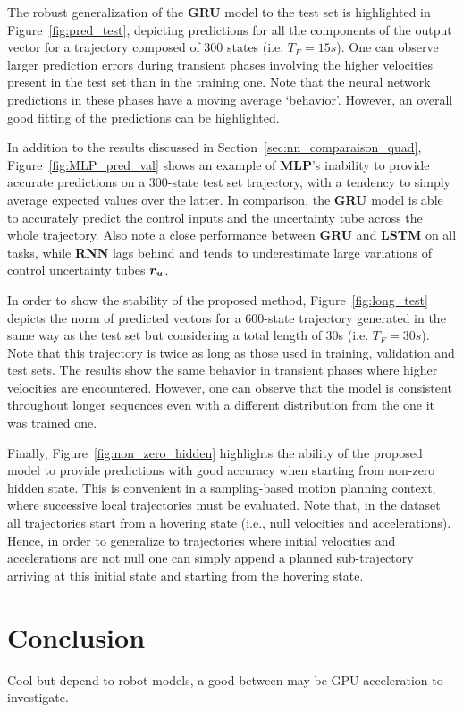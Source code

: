The robust generalization of the \textbf{GRU} model to the test set is highlighted in Figure~\ref{fig:pred_test}, depicting predictions for all the components of the output vector for a trajectory composed of 300 states (i.e. $T_F=15s$).
One can observe larger prediction errors during transient phases involving the higher velocities present in the test set than in the training one.
Note that the neural network predictions in these phases have a moving average `behavior'. 
However, an overall good fitting of the predictions can be highlighted.

In addition to the results discussed in Section~\ref{sec:nn_comparaison_quad}, Figure~\ref{fig:MLP_pred_val} shows an example of \textbf{MLP}'s inability to provide accurate predictions on a 300-state test set trajectory, with a tendency to simply average expected values over the latter.
In comparison, the \textbf{GRU} model is able to accurately predict the control inputs and the uncertainty tube across the whole trajectory. 
Also note a close performance between \textbf{GRU} and \textbf{LSTM} on all tasks, while \textbf{RNN} lags behind and tends to underestimate large variations of control uncertainty tubes $\boldsymbol{r_u}$.

In order to show the stability of the proposed method, Figure~\ref{fig:long_test} depicts the norm of predicted vectors for a 600-state trajectory generated in the same way as the test set but considering a total length of 30s (i.e. $T_F=30s$).
Note that this trajectory is twice as long as those used in training, validation and test sets.
The results show the same behavior in transient phases where higher velocities are encountered.
However, one can observe that the model is consistent throughout longer sequences even with a different distribution from the one it was trained one. 

Finally, Figure~\ref{fig:non_zero_hidden} highlights the ability of the proposed model to provide predictions with good accuracy when starting from non-zero hidden state. 
This is convenient in a sampling-based motion planning context, where successive local trajectories must be evaluated.
Note that, in the dataset all trajectories start from a hovering state (i.e., null velocities and accelerations). 
Hence, in order to generalize to trajectories where initial velocities and accelerations are not null one can simply append a planned sub-trajectory arriving at this initial state and starting from the hovering state.

\section{Conclusion} \label{sec:NN_concl}


Cool but depend to robot models, a good between may be GPU acceleration to investigate.